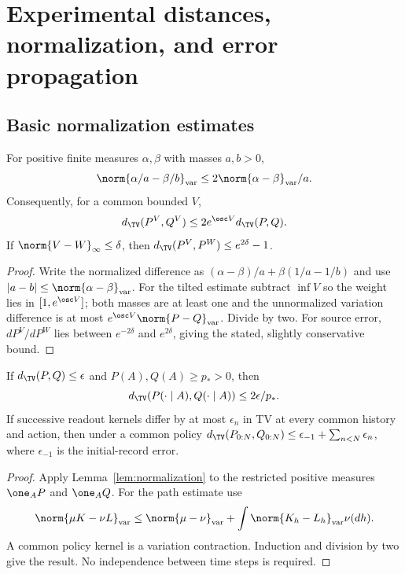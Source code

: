 \section{Experimental distances, normalization, and error propagation}\label{sec:approximation}
\subsection{Basic normalization estimates}
\begin{lemma}\label{lem:normalization}
For positive finite measures $\alpha,\beta$ with masses $a,b>0$,
\[
 \norm{\alpha/a-\beta/b}_{\rm var}\le2\norm{\alpha-\beta}_{\rm var}/a.
\]
Consequently, for a common bounded $V$,
\[
 d_{\TV}(P^V,Q^V)\le2e^{\osc V}d_{\TV}(P,Q).
\]
If $\norm{V-W}_\infty\le\delta$, then
$d_{\TV}(P^V,P^W)\le e^{2\delta}-1$.
\end{lemma}
\begin{proof}
Write the normalized difference as $(\alpha-\beta)/a+\beta(1/a-1/b)$ and use $|a-b|\le\norm{\alpha-\beta}_{\rm var}$. For the tilted estimate subtract $\inf V$ so the weight lies in $[1,e^{\osc V}]$; both masses are at least one and the unnormalized variation difference is at most $e^{\osc V}\norm{P-Q}_{\rm var}$. Divide by two. For source error, $dP^V/dP^W$ lies between $e^{-2\delta}$ and $e^{2\delta}$, giving the stated, slightly conservative bound.
\end{proof}

\begin{proposition}\label{prop:tv-budget}
If $d_{\TV}(P,Q)\le\epsilon$ and $P(A),Q(A)\ge p_*>0$, then
\[
 d_{\TV}(P(\cdot\mid A),Q(\cdot\mid A))\le2\epsilon/p_*.
\]
If successive readout kernels differ by at most $\epsilon_n$ in TV at every common history and action, then under a common policy
$d_{\TV}(P_{0:N},Q_{0:N})\le\epsilon_{-1}+\sum_{n<N}\epsilon_n$, where $\epsilon_{-1}$ is the initial-record error.
\end{proposition}
\begin{proof}
Apply Lemma~\ref{lem:normalization} to the restricted positive measures $\one_AP$ and $\one_AQ$. For the path estimate use
\[
 \norm{\mu K-\nu L}_{\rm var}
 \le\norm{\mu-\nu}_{\rm var}+\int\norm{K_h-L_h}_{\rm var}\nu(dh).
\]
A common policy kernel is a variation contraction. Induction and division by two give the result. No independence between time steps is required.
\end{proof}

